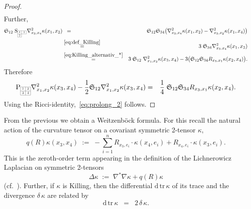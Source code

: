 \documentclass[11pt,a4paper]{article}
\theoremstyle{plain}
\theoremstyle{remark}
\newcommand{\cyclic}{\mathfrak{S}}
\renewcommand{\d}{\mathrm{d}}
\newcommand{\trace}{\mathrm{tr}}
\newcommand{\rmP}{\mathrm{P}}
\newcommand{\rmS}{\mathrm{S}}
\begin{document}
\begin{proof}
\begin{eqnarray*}
\end{eqnarray*}
Further, \begin{eqnarray*}
\cyclic_{12}\; \rmS_{\scaleto{\begin{array}{|c|c|}
\cline{1-2}
4 & 3 \\
\cline{1-2}
2 & \multicolumn{1}{c}{\;\;\;} \\
\cline{1-1}
\end{array}}{12pt}} \nabla^2_{x_3,x_4}\kappa(x_1,x_2)
&\;\;=\;\;& \cyclic_{12}\cyclic_{34} \big (\nabla^2_{x_3,x_4}\kappa(x_1,x_2) - \nabla^2_{x_3,x_2}\kappa(x_1,x_4) \big )\\
 &\stackrel{\eqref{eq:def_Killing}}{=} & 3\; \cyclic_{34} \nabla^2_{x_3,x_4}\kappa(x_1,x_2)\\
& \stackrel{\eqref{eq:Killing_alternativ_*}}{=} & 3\; \cyclic_{12} \; \nabla^2_{x_1,x_2}\kappa(x_3,x_4) - 3\big (\cyclic_{12}\cyclic_{34} R_{x_3,x_1}\kappa(x_2,x_4)\big ).
\end{eqnarray*} 
Therefore
\begin{eqnarray*}
\rmP_{\scaleto{\begin{array}{|c|c|}
\cline{1-2}
1 & 2 \\
\cline{1-2}
3 & 4 \\
\cline{1-2}
\end{array}}{12pt}} \nabla^2_{x_1,x_2}\kappa (x_3,x_4) - \frac{1}{2} \cyclic_{12}\nabla^2_{x_1,x_2}\kappa(x_3,x_4) & =&
                                                       \frac{1}{4}\; \cyclic_{12}\cyclic_{34} R_{x_3,x_1}\kappa(x_2,x_4).
\end{eqnarray*}
Using the Ricci-identity,~\eqref{eq:prolong_2} follows.
\end{proof}



From the previous we obtain a Weitzenböck formula. For this recall the natural action of the curvature tensor on a covariant symmetric 2-tensor $\kappa$,
\begin{equation}\label{eq:def_of_R*R}
q(R) \kappa(x_3,x_4)\;:=\;- \sum_{i=1}^nR_{x_3,e_i}\cdot \kappa(x_4,e_i) + R_{x_4,e_i}\cdot \kappa(x_3,e_i).
\end{equation}
This is the zeroth-order term appearing in the definition of the Lichnerowicz
Laplacian on symmetric 2-tensors 
\begin{equation}\label{eq:Lichnerowicz_Laplacian}
\Delta \kappa\;:=\;\nabla^*\nabla \kappa + q(R)\kappa
\end{equation}
(cf.~\cite[1.143]{Be}). Further, if $\kappa$ is Killing, then the differential
$\d\, \trace \, \kappa$ of
its trace and the divergence $\delta\, \kappa$ are related by
\begin{equation}\label{eq:divergenz_versus_differential_der_spur}
\d\, \trace \, \kappa\;\;=\;\;2\,\delta\,\kappa.
\end{equation}
\end{document}
